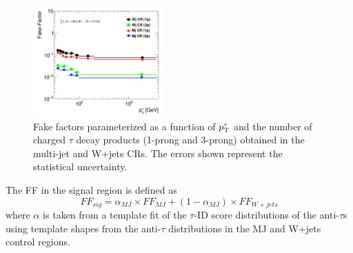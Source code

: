 		\begin{figure}[!thp]
			\begin{center}
			\includegraphics[width=0.45\textwidth]{chapters/chapter6_HPlus/images/FFs/FFs_inclusive_tracks_pT_FFsCR.png}
			\end{center}
			\caption{ Fake factors parameterized as a function of $p_{\text{T}}^{\tau}$ and the number of charged $\tau$ decay products (1-prong and 3-prong) obtained in the multi-jet and W+jets CRs. The errors shown represent the statistical uncertainty. 
			}
			\label{fig:bkg-FF-CR}
		\end{figure}
		The FF in the signal region is defined as 
		\begin{equation}\label{eqn:ff-sig}
		FF_{sig} = \alpha_{MJ} \times FF_{MJ} + (1 - \alpha_{MJ}) \times FF_{W+jets}
		\end{equation}
		where $\alpha$ is taken from a template fit of the $\tau$-ID score distributions of the anti-$\tau$s using template shapes from the anti-$\tau$ distributions in the MJ and W+jets control regions.


		\clearpage


